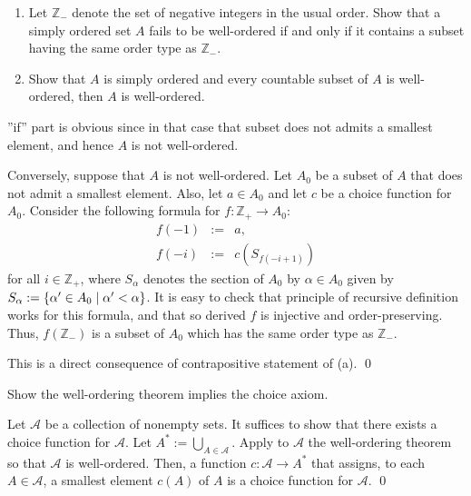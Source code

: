 \documentclass[a4paper,12pt]{article}
\begin{document}
\begin{exe}\leavevmode \par
	\begin{enumerate}
		\item
		      Let \( \mathbb{Z}_{-} \) denote the set of negative integers in the usual order.
		      Show that a simply ordered set \( A \) fails to be well-ordered
		      if and only if it contains a subset having the same order type as \( \mathbb{Z}_{-} \).
		\item
		      Show that \( A \) is simply ordered and every countable subset of \( A \)
		      is well-ordered, then \( A \) is well-ordered.
	\end{enumerate}
\end{exe}
\begin{sol}\leavevmode \par
	''if'' part is obvious since in that case that subset does not admits a smallest element,
	and hence \( A \) is not well-ordered.
	
	Conversely, suppose that \( A \) is not well-ordered.
	Let \( A_0 \) be a subset of \( A \) that does not admit a smallest element.
	Also, let \( a\in A_0 \) and let \( c \) be a choice function for \( A_0 \).
	Consider the following formula for \( f:\mathbb{Z}_{+} \to A_0 \):
	\begin{eqnarray*}
		f(-1)&:=&a,\\
		f(-i)&:=&c \left( S_{f(-i+1)} \right)
	\end{eqnarray*}
	for all \( i \in \mathbb{Z}_{+} \),
	where \( S_{\alpha} \) denotes the section of \( A_0 \) by \( \alpha \in A_0 \)
	given by
	\( S_{\alpha}:=\left\{ \alpha' \in A_0 \;|\; \alpha' < \alpha \right\} \).
	It is easy to check that principle of recursive definition works for this formula,
	and that so derived \( f \) is injective and order-preserving.
	Thus, \( f(\mathbb{Z}_{-}) \) is a subset of \( A_0 \) which has the same order type as \( \mathbb{Z}_{-} \).
	
	This is a direct consequence of contrapositive statement of (a).
	\qed\end{sol}

\begin{exe}
	Show the well-ordering theorem implies the choice axiom.
\end{exe}
\begin{sol}
	Let \( \mathcal{A} \) be a collection of nonempty sets.
	It suffices to show that there exists a choice function for \( \mathcal{A} \).
	Let \( A^{\ast}:=\bigcup_{A \in \mathcal{A}} \).
	Apply to \( \mathcal{A} \) the well-ordering theorem so that
	\( \mathcal{A} \) is well-ordered.
	Then, a function
	\( c:\mathcal{A} \to A^{\ast} \)
	that assigns, to each \( A \in \mathcal{A} \),
	a smallest element \( c(A) \) of \( A \) is a choice function for \( \mathcal{A} \).
	\qed\end{sol}
\end{document}
